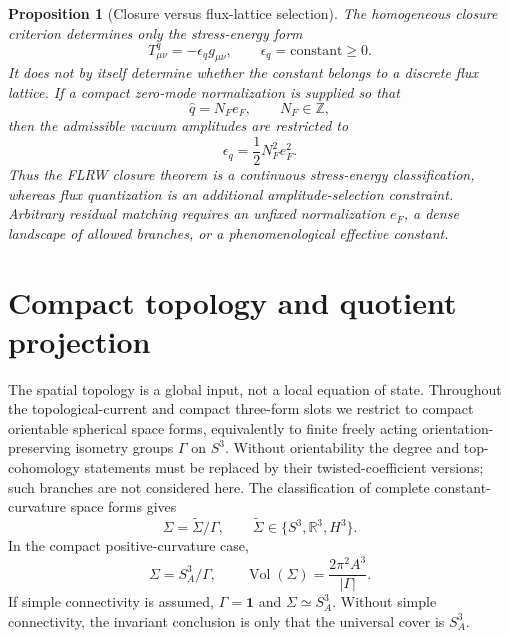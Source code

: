 \documentclass[
  aps,
  prd,
  reprint,
  superscriptaddress,
  floatfix,
  nofootinbib,
  longbibliography
]{revtex4-2}
\theoremstyle{plain}
\newtheorem{proposition}[theorem]{Proposition}
\theoremstyle{definition}
\theoremstyle{remark}
\DeclareMathOperator{\Vol}{Vol}
\newcommand{\id}{\mathbf 1}
\newcommand{\Z}{\mathbb Z}
\newcommand{\R}{\mathbb R}
\newcommand{\eps}{\epsilon}
\newcommand{\qhat}{\widehat q}
\newcommand{\NF}{N_F}
\newcommand{\eF}{e_F}
\begin{document}
\begin{proposition}[Closure versus flux-lattice selection]
The homogeneous closure criterion determines only the stress-energy form
\begin{equation}
T^q_{\mu\nu}=-\eps_q g_{\mu\nu},
\qquad
\eps_q=\text{constant}\ge0 .
\end{equation}
It does not by itself determine whether the constant belongs to a discrete flux
lattice.  If a compact zero-mode normalization is supplied so that
\begin{equation}
\qhat=\NF\eF,
\qquad
\NF\in\Z,
\end{equation}
then the admissible vacuum amplitudes are restricted to
\begin{equation}
\eps_q=\frac12\NF^2\eF^2 .
\label{eq:flux_lattice_v5}
\end{equation}
Thus the FLRW closure theorem is a continuous stress-energy classification,
whereas flux quantization is an additional amplitude-selection constraint.
Arbitrary residual matching requires an unfixed normalization \(\eF\), a dense
landscape of allowed branches, or a phenomenological effective constant.
\end{proposition}

\section{Compact topology and quotient projection}

The spatial topology is a global input, not a local equation of state.
Throughout the topological-current and compact three-form slots we restrict to
compact orientable spherical space forms, equivalently to finite freely acting
orientation-preserving isometry groups \(\Gamma\) on \(S^3\).  Without
orientability the degree and top-cohomology statements must be replaced by their
twisted-coefficient versions; such branches are not considered here.  The
classification of complete constant-curvature space forms gives~\cite{HawkingEllis,Wolf}
\begin{equation}
\Sigma=\widetilde\Sigma/\Gamma,
\qquad
\widetilde\Sigma\in\{S^3,\R^3,H^3\} .
\end{equation}
In the compact positive-curvature case,
\begin{equation}
\Sigma=S_A^3/\Gamma,
\qquad
\Vol(\Sigma)=\frac{2\pi^2A^3}{|\Gamma|} .
\label{eq:space_form_volume_v5}
\end{equation}
If simple connectivity is assumed, \(\Gamma=\id\) and \(\Sigma\simeq S_A^3\).
Without simple connectivity, the invariant conclusion is only that the
universal cover is \(S_A^3\).
\end{document}
